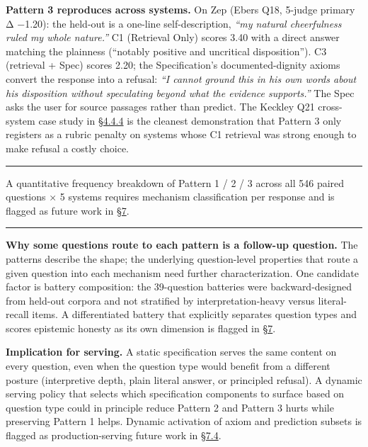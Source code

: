 \textbf{Pattern 3 reproduces across systems.} On Zep (Ebers Q18, 5-judge
primary Δ −1.20): the held-out is a one-line self-description,
\emph{``my natural cheerfulness ruled my whole nature.''} C1 (Retrieval
Only) scores 3.40 with a direct answer matching the plainness (``notably
positive and uncritical disposition''). C3 (retrieval + Spec) scores
2.20; the Specification's documented-dignity axioms convert the response
into a refusal: \emph{``I cannot ground this in his own words about his
disposition without speculating beyond what the evidence supports.''}
The Spec asks the user for source passages rather than predict. The
Keckley Q21 cross-system case study in \hyperref[case-study-cross-system-refusal-on-keckley-q21]{§4.4.4} is the cleanest
demonstration that Pattern 3 only registers as a rubric penalty on
systems whose C1 retrieval was strong enough to make refusal a costly
choice.

\begin{center}\rule{0.5\linewidth}{0.5pt}\end{center}

A quantitative frequency breakdown of Pattern 1 / 2 / 3 across all 546
paired questions × 5 systems requires mechanism classification per
response and is flagged as future work in \hyperref[future-work]{§7}.

\begin{center}\rule{0.5\linewidth}{0.5pt}\end{center}

\textbf{Why some questions route to each pattern is a follow-up
question.} The patterns describe the shape; the underlying
question-level properties that route a given question into each
mechanism need further characterization. One candidate factor is battery
composition: the 39-question batteries were backward-designed from
held-out corpora and not stratified by interpretation-heavy versus
literal-recall items. A differentiated battery that explicitly separates
question types and scores epistemic honesty as its own dimension is
flagged in \hyperref[future-work]{§7}.

\textbf{Implication for serving.} A static specification serves the same
content on every question, even when the question type would benefit
from a different posture (interpretive depth, plain literal answer, or
principled refusal). A dynamic serving policy that selects which
specification components to surface based on question type could in
principle reduce Pattern 2 and Pattern 3 hurts while preserving Pattern
1 helps. Dynamic activation of axiom and prediction subsets is flagged
as production-serving future work in \hyperref[production-serving-and-infrastructure]{§7.4}.

